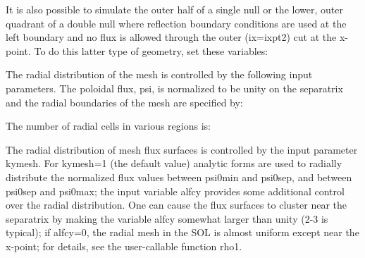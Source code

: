 \documentclass [12pt]{article}
\def\hsa{\hskip.4truein}
\begin{document}
It is also
possible to simulate the outer half of a single null or the lower, outer
quadrant of a double null where reflection boundary conditions are used at the
left boundary and no flux is allowed through the outer (ix=ixpt2) cut at the
x-point. To do this latter type of geometry, set these variables: {\sf
{}
}
The radial distribution of the mesh is controlled by the following
input parameters.  The poloidal flux, psi, is normalized to be unity
on the separatrix and the radial boundaries of the mesh are specified by:
{\sf
{}
}
The number of radial cells in various regions is:
{\sf
{}
}
The radial distribution of mesh flux surfaces is controlled by the
input parameter {\sf kymesh}.  For {\sf kymesh}=1 (the default value) analytic forms are used to radially
distribute the normalized flux values between {\sf psi0min} and {\sf psi0sep}, and
between {\sf psi0sep} and {\sf psi0max}; the input variable {\sf alfcy} provides some
additional control over the radial distribution.  One can cause the
flux surfaces to cluster near the separatrix by making the variable
alfcy somewhat larger than unity (2-3 is typical); if {\sf alfcy}=0, the
radial mesh in the SOL is almost uniform except near the x-point; for details, see the
user-callable function {\sf rho1}.
\end{document}
